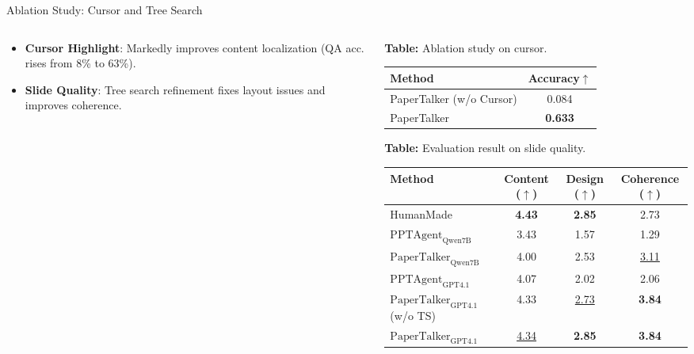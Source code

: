 \documentclass{beamer}
\begin{document}
\begin{frame}{Ablation Study: Cursor and Tree Search}
  \begin{columns}[T] %
    \begin{column}{0.4\textwidth}
      \small
      \begin{itemize}
        \item \textbf{Cursor Highlight}: Markedly improves content localization (QA acc. rises from 8\% to 63\%).\\
        \item \textbf{Slide Quality}: Tree search refinement fixes layout issues and improves coherence.
      \end{itemize}
    \end{column}

    \begin{column}{0.6\textwidth}
      \centering
      \scriptsize
      \tiny
      \setlength{\tabcolsep}{2pt}
      {\scriptsize \textbf{Table:} Ablation study on cursor.}
      \begin{tabular}{lc}
        \toprule
        Method & Accuracy$\uparrow$ \\
        \midrule
        PaperTalker (w/o Cursor) & 0.084 \\
        PaperTalker & \textbf{0.633} \\
        \bottomrule
      \end{tabular}

      \vspace{0.8\baselineskip}

    \begin{table}
      \centering
      \tiny
      \setlength{\tabcolsep}{2pt}
      {\scriptsize \textbf{Table:} Evaluation result on slide quality.}
      \vspace{2pt} %
      \begin{tabular}{lccc}
        \toprule
        Method & Content ($\uparrow$) & Design ($\uparrow$) & Coherence ($\uparrow$) \\
        \midrule
        HumanMade & \textbf{4.43} & \textbf{2.85} & 2.73 \\
        \midrule
        $\text{PPTAgent}_\text{Qwen7B}$ & 3.43 & 1.57 & 1.29 \\
        $\text{PaperTalker}_\text{Qwen7B}$ & 4.00 & 2.53 & \underline{3.11} \\
        \midrule
        $\text{PPTAgent}_\text{GPT4.1}$ & 4.07 & 2.02 & 2.06 \\
        $\text{PaperTalker}_\text{GPT4.1}$(w/o TS) & 4.33 & \underline{2.73} & \textbf{3.84} \\
        $\text{PaperTalker}_\text{GPT4.1}$ & \underline{4.34} & \textbf{2.85} & \textbf{3.84} \\
        \bottomrule
      \end{tabular}


\end{table}
\end{column}
\end{columns}
\end{frame}
\end{document}
